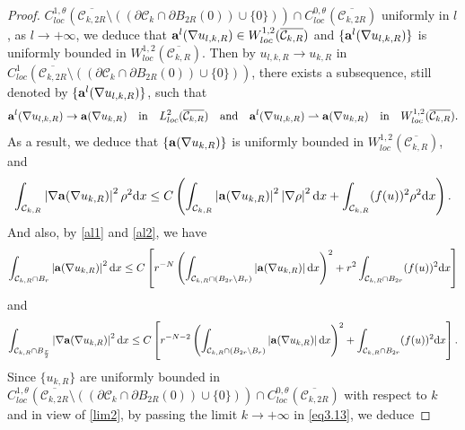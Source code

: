 \documentclass[12pt]{amsart}
\theoremstyle{definition}
\theoremstyle{remark}
\theoremstyle{conclusion}
\theoremstyle{conjecture}
\numberwithin{equation}{section}
\begin{document}
\begin{proof}
 $C^{1,\theta}_{loc}(\overline{\mathcal{C}_{k,2R}}\setminus((\partial\mathcal{C}_k\cap\partial B_{2R}(0))\cup\{0\}))\cap C^{0,\theta}_{loc}(\overline{\mathcal{C}_{k,2R}})$ uniformly in $l$, as $l\rightarrow+\infty$, we deduce that ${\bf{a}}^l(\nabla u_{l,k,R})\in W^{1,2}_{loc}(\overline{\mathcal{C}_{k,R}})$ and $\{{\bf{a}}^l(\nabla u_{l,k,R})\}$
is uniformly bounded in $ W^{1,2}_{loc}(\overline{\mathcal{C}_{k,R}})$. Then by $u_{l,k,R}\rightarrow u_{k,R}$ in $C^{1}_{loc}(\overline{\mathcal{C}_{k,2R}}\setminus((\partial\mathcal{C}_k\cap\partial B_{2R}(0))\cup\{0\}))$, there exists a subsequence, still denoted by $\{{\bf{a}}^l(\nabla u_{l,k,R})\}$, such that
\begin{equation*}
{\bf{a}}^l(\nabla u_{l,k,R})\rightarrow {\bf{a}}(\nabla u_{k,R})\quad\text{in}\quad L^2_{loc}(\overline{\mathcal{C}_{k,R}})\quad\text{and}\quad{\bf{a}}^l(\nabla u_{l,k,R})\rightharpoonup  {\bf{a}}(\nabla u_{k,R})\quad\text{in}\quad W^{1,2}_{loc}(\overline{\mathcal{C}_{k,R}}).
\end{equation*}
As a result, we deduce that $\{{\bf{a}}(\nabla u_{k,R})\}$
is uniformly bounded in $W^{1,2}_{loc}(\overline{\mathcal{C}_{k,R}})$, and
\begin{equation}\label{eq3.13}
    \int_{\mathcal{C}_{k,R}}\left\lvert \nabla {\bf{a}}(\nabla u_{k,R})\right\rvert^2\rho^2\mathrm{d}x\leq
    C\left(\int_{\mathcal{C}_{k,R}}\left\lvert {\bf{a}}(\nabla u_{k,R})\right\rvert^2\left\lvert\nabla\rho \right\rvert^2 \mathrm{d}x+
    \int_{\mathcal{C}_{k,R}}(f(u))^2\rho^2\mathrm{d}x\right).
\end{equation}
And also, by \eqref{al1} and \eqref{al2}, we have
\begin{equation}\label{a1}
\int_{\mathcal{C}_{k,R}\cap B_r}\left\lvert {\bf{a}}(\nabla u_{k,R})\right\rvert^2\mathrm{d}x\leq C\left[r^{-N}\left(\int_{\mathcal{C}_{k,R}\cap (B_{2r}\backslash B_r) }\left\lvert {\bf{a}}(\nabla u_{k,R})\right\rvert\mathrm{d}x\right)^2+r^2\int_{\mathcal{C}_{k,R}\cap B_{2r}}(f(u))^2\mathrm{d}x \right]
\end{equation}
and
\begin{equation}\label{a2}
 \int_{\mathcal{C}_{k,R}\cap B_{\frac{r}{2}}}\left\lvert \nabla {\bf{a}}(\nabla u_{k,R})\right\rvert^2\mathrm{d}x\leq C\left[r^{-N-2}\left(\int_{\mathcal{C}_{k,R}\cap (B_{2r}\backslash B_r) }\left\lvert {\bf{a}}(\nabla u_{k,R})\right\rvert\mathrm{d}x\right)^2+\int_{\mathcal{C}_{k,R}\cap B_{2r}}(f(u))^2\mathrm{d}x \right].
\end{equation}
Since $\{u_{k,R}\}$ are uniformly bounded in $C^{1,\theta}_{loc}(\overline{\mathcal{C}_{k,2R}}\setminus((\partial\mathcal{C}_k\cap\partial B_{2R}(0))\cup\{0\}))\cap C^{0,\theta}_{loc}(\overline{\mathcal{C}_{k,2R}})$ with respect to $k$ and in view of \eqref{lim2}, by passing the limit $k\rightarrow+\infty$ in \eqref{eq3.13}, we deduce

\end{proof}
\end{document}
